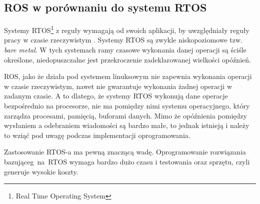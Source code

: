 {    %
    \subsection{ROS w porównaniu do systemu RTOS}
    {
        Systemy RTOS\footnote{Real Time Operating System} z reguły wymagają od swoich aplikacji, by uwzględniały reguły pracy w czasie rzeczywistym \cite{rtos}. Systemy RTOS są zwykle niskopoziomowe tzw. \textit{bare metal}. W tych systemach ramy czasowe wykonania danej operacji są ściśle określone, niedopuszczalne jest przekroczenie zadeklarowanej wielkości opóźnień.

        ROS, jako że działa pod systemem linuksowym nie zapewnia wykonania operacji w czasie rzeczywistym, nawet nie gwarantuje wykonania żadnej operacji w zadanym czasie. A to dlatego, że systemy RTOS wykonują dane operacje bezpośrednio na procesorze, nie ma pomiędzy nimi systemu operacyjnego, który zarządza procesami, pamięcią, buforami danych. Mimo że opóźnienia pomiędzy wysłaniem a odebraniem wiadomości są bardzo małe, to jednak istnieją i należy to wziąć pod uwagę podczas implementacji oprogramowania.
        
        Zastosowanie RTOS-a ma pewną znaczącą wadę. Oprogramowanie rozwiązania bazująceg~na~RTOS wymaga bardzo dużo czasu i testowania oraz sprzętu, czyli generuje wysokie koszty.
    }
}